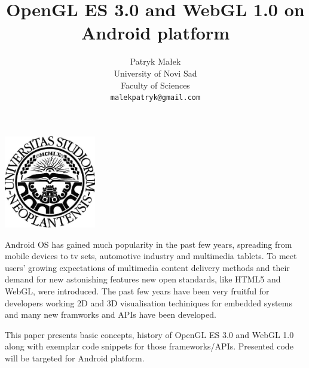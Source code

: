 \documentclass[a4paper,12pt]{article}
\renewenvironment{abstract}
 {\small
  \begin{center}
  \bfseries \abstractname\vspace{-.5em}\vspace{0pt}
  \end{center}
  \list{}{
    \setlength{\leftmargin}{1cm}%
    \setlength{\rightmargin}{\leftmargin}%
  }%
  \item\relax}
 {\endlist}
\begin{document}


\title{OpenGL ES 3.0 and WebGL 1.0 on Android platform}
\author{Patryk Małek\\
        University of Novi Sad\\
        Faculty of Sciences\\
        \texttt{malekpatryk@gmail.com}
        }
\date{}         %
\maketitle

\thispagestyle{empty}



\vspace{5pc}

\centerline{
\includegraphics[width=0.3\textwidth,height=0.3\textheight,keepaspectratio]{NoviSadLogoGray.jpg}
}

\vspace{5pc}

\begin{abstract}
\label{Abstract}
Android OS has gained much popularity in the past few years, spreading from mobile devices to tv sets, automotive industry and multimedia tablets. 
To meet users' growing expectations of multimedia content delivery methods and their demand for new astonishing features new open standards, like HTML5 and WebGL, were introduced. 
The past few years have been very fruitful for developers working 2D and 3D visualisation techiniques for embedded systems and many new framworks and APIs have been developed.

This paper presents basic concepts, history of OpenGL ES 3.0 and WebGL 1.0 along with exemplar code snippets for those frameworks/APIs.
Presented code will be targeted for Android platform.
\end{abstract}

\pagebreak
\end{document}
